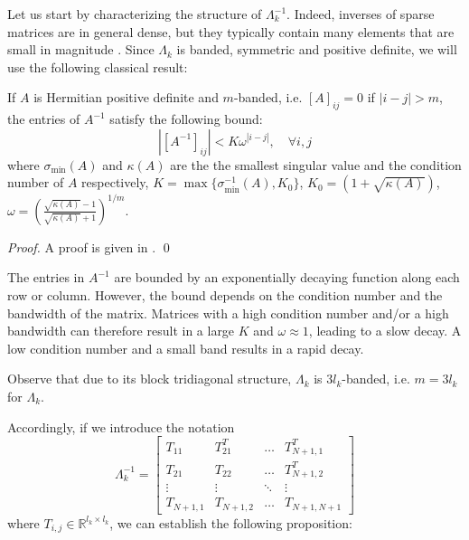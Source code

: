 Let us start by characterizing the structure of $\Lambda_k^{-1}$. Indeed, inverses of sparse matrices are in general dense, but they typically contain many elements that are small in magnitude \cite{Benzi2002}. Since $\Lambda_k$ is banded, symmetric and positive definite, we will use the following classical result:
\begin{lemma} \label{l:decay}
If $A$ is Hermitian positive definite and $m$-banded, i.e. $[A]_{ij} = 0$ if $|i-j| > m$, the entries of $A^{-1}$ satisfy the following bound:
\begin{equation}
|[A^{-1}]_{ij}| < K\omega^{|i-j|}, \quad \forall i,j
\end{equation}
where $\sigma_{\min}(A)$ and $\kappa(A)$ are the the smallest singular value and the condition number of $A$ respectively, $K = \max \{ \sigma_{\min}^{-1}(A), K_0 \}$, $K_0 = (1 + \sqrt{\kappa(A)})$, $\omega = \left( \frac{\sqrt{\kappa(A)} - 1}{\sqrt{\kappa(A)} + 1} \right)^{1/m}$.
\end{lemma}
\begin{proof}
A proof is given in \cite{Demko1986}. \qed
\end{proof}
\begin{remark}
The entries in $A^{-1}$ are bounded by an exponentially decaying function along each row or column. However, the bound depends on the condition number and the bandwidth of the matrix. Matrices with a high condition number and/or a high bandwidth can therefore result in a large $K$ and $\omega \approx 1$, leading to a slow decay. A low condition number and a small band results in a rapid decay.
\end{remark}
\begin{remark}
Observe that due to its block tridiagonal structure, $\Lambda_k$ is $3 l_k$-banded, i.e. $m = 3 l_k$ for $\Lambda_k$.
\end{remark}
Accordingly, if we introduce the notation
\begin{equation}
\Lambda_k^{-1} = \left[ \begin{array}{cccc}
T_{11} & T_{21}^T & \hdots & T_{N+1,1}^T \\
T_{21} & T_{22} & \hdots & T_{N+1,2}^T \\
\vdots & \vdots  & \ddots & \vdots \\
T_{N+1,1} & T_{N+1,2} & \hdots & T_{N+1,N+1}
\end{array} \right]
\end{equation}
where $T_{i,j} \in \mathbb{R}^{l_{k} \times l_{k}}$, we can establish the following proposition:

